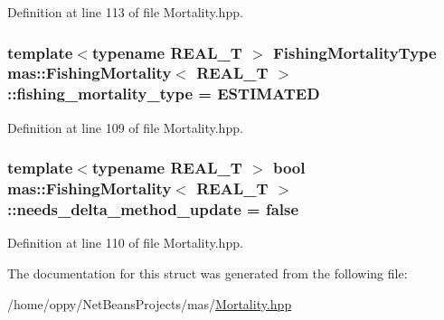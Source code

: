 Definition at line 113 of file Mortality.\-hpp.

\hypertarget{structmas_1_1_fishing_mortality_aba52dc6a63a8c8bc895b946cba5a5309}{
\subsubsection[{fishing\-\_\-mortality\-\_\-type}]{\setlength{\rightskip}{0pt plus 5cm}template$<$typename R\-E\-A\-L\-\_\-\-T $>$ {\bf Fishing\-Mortality\-Type} {\bf mas\-::\-Fishing\-Mortality}$<$ R\-E\-A\-L\-\_\-\-T $>$\-::fishing\-\_\-mortality\-\_\-type = {\bf E\-S\-T\-I\-M\-A\-T\-E\-D}}}\label{structmas_1_1_fishing_mortality_aba52dc6a63a8c8bc895b946cba5a5309}


Definition at line 109 of file Mortality.\-hpp.

\hypertarget{structmas_1_1_fishing_mortality_aa5e8bbb289155d313e98aa8349dfdf2c}{
\subsubsection[{needs\-\_\-delta\-\_\-method\-\_\-update}]{\setlength{\rightskip}{0pt plus 5cm}template$<$typename R\-E\-A\-L\-\_\-\-T $>$ bool {\bf mas\-::\-Fishing\-Mortality}$<$ R\-E\-A\-L\-\_\-\-T $>$\-::needs\-\_\-delta\-\_\-method\-\_\-update = false}}\label{structmas_1_1_fishing_mortality_aa5e8bbb289155d313e98aa8349dfdf2c}


Definition at line 110 of file Mortality.\-hpp.



The documentation for this struct was generated from the following file\-:\begin{DoxyCompactItemize}
\item 
/home/oppy/\-Net\-Beans\-Projects/mas/\hyperlink{_mortality_8hpp}{Mortality.\-hpp}\end{DoxyCompactItemize}
